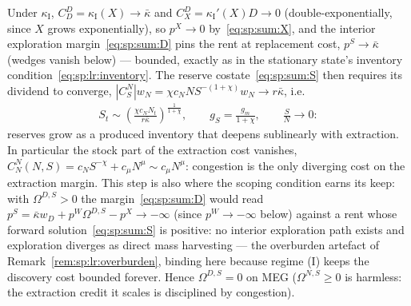  Under $\kappa_{\mathrm I}$,
$C^D_D=\kappa_{\mathrm I}\left(X\right)\to\bar\kappa$ and
$C^D_X=\kappa_{\mathrm I}'\left(X\right)D\to0$ (double-exponentially, since $X$ grows
exponentially), so $p^X\to0$ by~\eqref{eq:sp:sum:X}, and the interior exploration
margin~\eqref{eq:sp:sum:D} pins the rent at replacement cost, $p^S\to\bar\kappa$ (wedges
vanish below) --- bounded, exactly as in the stationary state's inventory
condition~\eqref{eq:sp:lr:inventory}. The reserve costate~\eqref{eq:sp:sum:S} then requires
its dividend to converge,
$\left|C^N_S\right|w_N=\chi c_NNS^{-\left(1+\chi\right)}w_N\to r\bar\kappa$, i.e.
\begin{align}
S_t\sim\left(\frac{\chi c_N N_t}{r\bar\kappa}\right)^{\frac{1}{1+\chi}},
\qquad
g_S=\frac{g_m}{1+\chi},
\qquad
\frac{S}{N}\to0 :
\label{eq:app:wh:meg:inventory}
\end{align}
reserves grow as a produced inventory that deepens sublinearly with extraction. In
particular the stock part of the extraction cost vanishes,
$C^N_N\left(N,S\right)=c_NS^{-\chi}+c_\mu N^\mu\sim c_\mu N^\mu$: congestion is the only
diverging cost on the extraction margin. This step is also where the scoping condition earns
its keep: with $\Omega^{D,S}>0$ the margin~\eqref{eq:sp:sum:D} would read
$p^S=\bar\kappa w_D+p^W\Omega^{D,S}-p^X\to-\infty$ (since $p^W\to-\infty$ below) against a
rent whose forward solution~\eqref{eq:sp:sum:S} is positive: no interior exploration path
exists and exploration diverges as direct mass harvesting --- the overburden artefact of
Remark~\ref{rem:sp:lr:overburden}, binding here because regime (I) keeps the discovery cost
bounded forever. Hence $\Omega^{D,S}=0$ on MEG ($\Omega^{N,S}\ge0$ is harmless: the extraction
credit it scales is disciplined by congestion).

